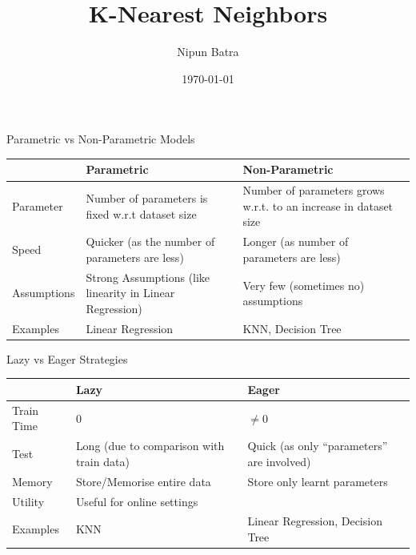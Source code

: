 \documentclass[usenames,dvipsnames]{beamer}
\title{K-Nearest Neighbors}
\date{\today}
\author{Nipun Batra}
\institute{IIT Gandhinagar}
\begin{document}
  \maketitle

{
	
}

{
	
}


\begin{frame}{Parametric vs Non-Parametric Models}
\begin{table}[]
\begin{tabular}{|l|p{3.5cm}|p{3.5cm}|}
\hline
            & Parametric                                               & Non-Parametric                                                   \\ \hline
Parameter   & Number of parameters is fixed w.r.t dataset size         & Number of parameters grows w.r.t. to an increase in dataset size \\ \hline
Speed       & Quicker (as the number of parameters are less)           & Longer (as number of parameters are less)                        \\ \hline
Assumptions & Strong Assumptions (like linearity in Linear Regression) & Very few (sometimes no) assumptions                              \\ \hline
Examples    & Linear Regression                                        & KNN, Decision Tree                     \\ \hline                         
\end{tabular}
\end{table}
\end{frame}

\begin{frame}{Lazy vs Eager Strategies}
	\begin{table}[]
		\begin{tabular}{|l|p{3.5cm}|p{3.5cm}|}
			\hline
			& Lazy                                     & Eager                                   \\
			\hline
			Train Time & $0$                                      & $\neq 0$                                \\
			\hline
			Test       & Long (due to comparison with train data) & Quick (as only ``parameters'' are involved) \\
			\hline
			Memory     & Store/Memorise entire data               & Store only learnt parameters            \\
			\hline
			Utility    & Useful for online settings               &                                         \\
			\hline
			Examples   & KNN                                      & Linear Regression, Decision Tree       \\ \hline
		\end{tabular}
	\end{table}
\end{frame}
\end{document}
